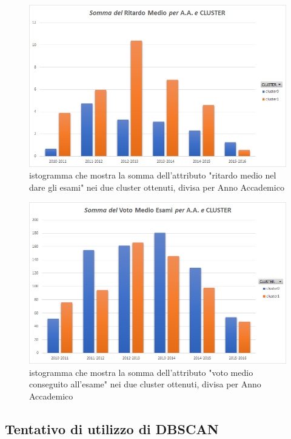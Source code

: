         \begin{figure}
            \centering
            \caption{istogramma che mostra la somma dell'attributo "ritardo medio nel dare gli esami" nei due cluster ottenuti, divisa per Anno Accademico}
            \label{ritardo}
            \includegraphics[scale=0.5]{../cluster/min_kmeans_2cl_ritardo.png}
        \end{figure}

        \begin{figure}
            \centering
            \caption{istogramma che mostra la somma dell'attributo "voto medio conseguito all'esame" nei due cluster ottenuti, divisa per Anno Accademico}
            \label{voto}
            \includegraphics[scale=0.5]{../cluster/min_kmeans_2cl_voto.png}
        \end{figure}

    \subsection{Tentativo di utilizzo di DBSCAN}

